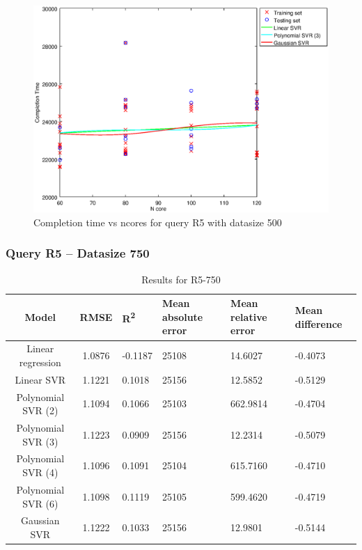 \documentclass[a4paper,11pt]{article}
\begin{document}
\begin {figure}[hbtp]
\centering
\includegraphics[width=\textwidth]{output/R5_500_ONLY_1_LINEAR_NCORE/plot_R5_500_bestmodels.eps}
\caption{Completion time vs ncores for query R5 with datasize 500}
\label{fig:coreonly_linear_R5_500}
\end {figure}

\newpage
\subsubsection{Query R5 -- Datasize 750}
\begin{table}[H]
	\centering
	\begin{adjustbox}{center}
		\begin{tabular}{c | c M{1.2cm} M{2.5cm} M{2.5cm} M{1.8cm}}
			Model & RMSE & R\textsuperscript{2} & Mean absolute error & Mean relative error & Mean difference \tabularnewline
			\hline
			Linear regression & 1.0876 & -0.1187 &  25108 & 14.6027 & -0.4073 \\
			Linear SVR & 1.1221 & 0.1018 &  25156 & 12.5852 & -0.5129 \\
			Polynomial SVR (2) & 1.1094 & 0.1066 &  25103 & 662.9814 & -0.4704 \\
			Polynomial SVR (3) & 1.1223 & 0.0909 &  25156 & 12.2314 & -0.5079 \\
			Polynomial SVR (4) & 1.1096 & 0.1091 &  25104 & 615.7160 & -0.4710 \\
			Polynomial SVR (6) & 1.1098 & 0.1119 &  25105 & 599.4620 & -0.4719 \\
			Gaussian SVR & 1.1222 & 0.1033 &  25156 & 12.9801 & -0.5144 \\
		\end{tabular}
	\end{adjustbox}
	\\
	\caption{Results for R5-750}
	\label{fig:coreonly_linear_R5_750}
\end{table}
\end{document}
